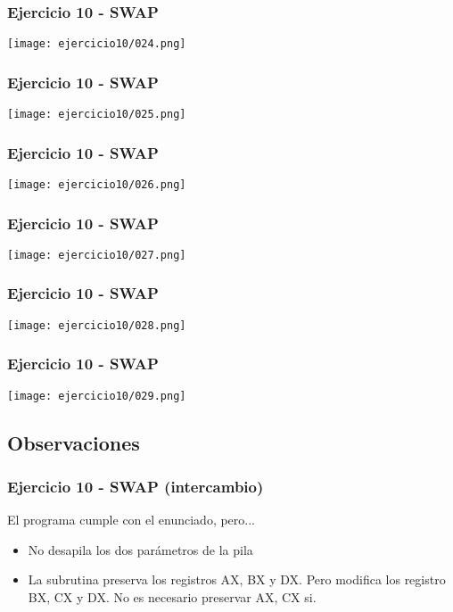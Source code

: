 \documentclass{beamer}
\begin{document}
\begin{frame}
\frametitle{Ejercicio 10 - SWAP}
\texttt{[image: ejercicio10/024.png]}
\end{frame}

\begin{frame}
\frametitle{Ejercicio 10 - SWAP}
\texttt{[image: ejercicio10/025.png]}
\end{frame}

\begin{frame}
\frametitle{Ejercicio 10 - SWAP}
\texttt{[image: ejercicio10/026.png]}
\end{frame}

\begin{frame}
\frametitle{Ejercicio 10 - SWAP}
\texttt{[image: ejercicio10/027.png]}
\end{frame}

\begin{frame}
\frametitle{Ejercicio 10 - SWAP}
\texttt{[image: ejercicio10/028.png]}
\end{frame}

\begin{frame}
\frametitle{Ejercicio 10 - SWAP}
\texttt{[image: ejercicio10/029.png]}
\end{frame}

\subsection{Observaciones}

\begin{frame}
\frametitle{Ejercicio 10 - SWAP (intercambio) }
El programa cumple con el enunciado, pero...
\begin{itemize}
\item No desapila los dos parámetros de la pila
\item La subrutina preserva los registros AX, BX y DX. Pero modifica los registro BX, CX y DX. No es necesario preservar AX, CX si.
\end{itemize}
\end{frame}
\end{document}
